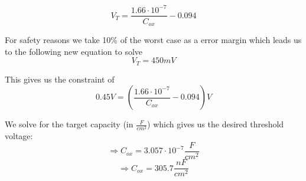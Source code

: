  \begin{equation}
V_T= \frac{1.66 \cdot 10^{-7}}{C_{ox}}-0.094
\end{equation}

For safety reasons we take 10\% of the worst case as a error margin which leads us to the following new equation to solve
 \begin{equation}
V_T = 450mV
\end{equation}

This gives us the constraint of
\begin{equation}
0.45 V = \left( \frac{1.66 \cdot 10^{-7}}{C_{ox}}-0.094 \right) V
\end{equation}

We solve for the target capacity (in $\frac{F}{cm^2}$) which gives us the desired threshold voltage:
\begin{equation}
\Rightarrow
C_{ox}
=
3.057 \cdot {10}^{-7} \frac{F}{cm^2}
\end{equation}
\begin{equation}
\Rightarrow
C_{ox}
=
305.7 \frac{nF}{cm^2}
\end{equation}